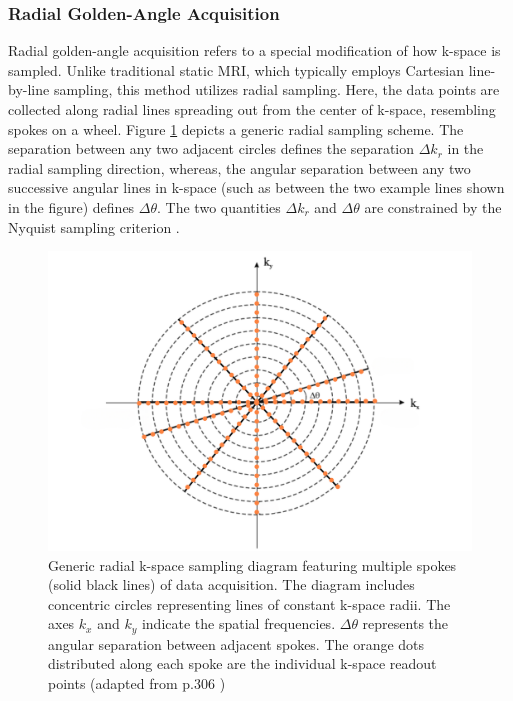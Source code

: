 \documentclass{micro-econ-thesis}
\begin{document}
\subsubsection{Radial Golden-Angle Acquisition}


Radial golden-angle acquisition refers to a special modification of how k-space is sampled. Unlike traditional static MRI, which typically employs Cartesian line-by-line sampling, this method utilizes radial sampling. Here, the data points are collected along radial lines spreading out from the center of k-space, resembling spokes on a wheel. Figure \ref{fig:radial} depicts a generic radial sampling scheme. The separation between any two adjacent circles defines the separation $\Delta k_r$ in the radial sampling direction, whereas, the angular separation between any two successive angular lines in k-space (such as between the two example lines shown in the figure) defines $\Delta \theta$. The two quantities $\Delta k_r$ and $\Delta \theta$ are constrained by the Nyquist sampling criterion \parencite{brown_magnetic_2014}. 
  
 \begin{figure}[H]
 	\centering
 	\includegraphics[scale=0.4]{k_space_2}
 	\caption{Generic radial k-space sampling diagram featuring multiple spokes (solid black lines) of data acquisition. The diagram includes concentric circles representing lines of constant k-space radii. The axes $k_x$ and $k_y$ indicate the spatial frequencies. $\Delta \theta$ represents the angular separation between adjacent spokes. The orange dots distributed along each spoke are the individual k-space readout points (adapted from p.306 \cite{brown_magnetic_2014} )  }
 	\label{fig:radial}
 \end{figure}
 
\end{document}
